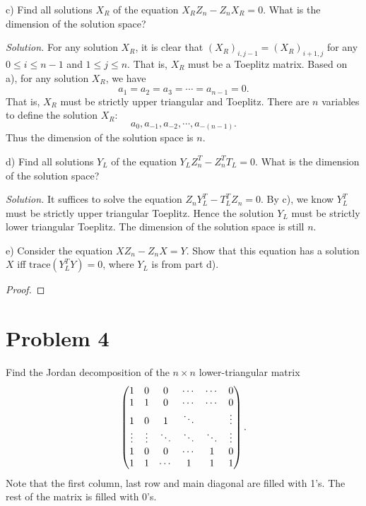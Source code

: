 \documentclass[12pt]{article}
\theoremstyle{plain}
\begin{document}
c) Find all solutions $X_R$ of the equation $X_RZ_n - Z_nX_R = 0$. What is the dimension of the solution space?

{\it Solution.} For any solution $X_R$, it is clear that $(X_R)_{i,j-1} = (X_R)_{i+1,j}$ for any $0\leq i \leq n-1$ and $1\leq j\leq n$. That is, $X_R$ must be a Toeplitz matrix.
Based on a), for any solution $X_R$, we have 
$$a_1 = a_2 = a_3 = \cdots = a_{n-1} = 0.$$
That is, $X_R$ must be strictly upper triangular and Toeplitz. There are $n$ variables to define the solution $X_R$:
$$a_0, a_{-1}, a_{-2}, \cdots, a_{-(n-1)}.$$
Thus the dimension of the solution space is $n$.

d) Find all solutions $Y_L$ of the equation $Y_LZ_n^T - Z_n^TT_L = 0$. What is the dimension of the solution space?

{\it Solution.} It suffices to solve the equation $Z_nY_L^T - T_L^T Z_n = 0$. By c), we know $Y_L^T$ must be strictly upper triangular Toeplitz. Hence the solution $Y_L$ must be strictly lower triangular Toeplitz. The dimension of the solution space is still $n$.

e) Consider the equation $XZ_n - Z_nX = Y$. Show that this equation has a solution $X$ iff $\mathrm{trace}(Y_L^TY)=0$, where $Y_L$ is from part d).

\begin{proof}

\end{proof}


\section{Problem 4}
Find the Jordan decomposition of the $n\times n$ lower-triangular matrix
$$
\begin{pmatrix}
1 & 0 & 0 & \cdots & \cdots & 0 \\
1 & 1 & 0 & \cdots & \cdots & 0 \\
1 & 0 & 1 & \ddots &  & \vdots \\
\vdots & \vdots & \ddots & \ddots & \ddots & \vdots \\
1 & 0 & 0 & \cdots & 1 & 0 \\
1 & 1 & \cdots & 1 & 1 & 1 \\
\end{pmatrix}.
$$
Note that the first column, last row and main diagonal are filled with 1's. The rest of the matrix is filled with 0's.
\end{document}
